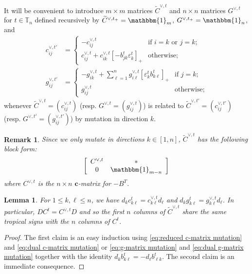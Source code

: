 \documentclass{amsart}
\newtheorem{lemma}[theorem]{Lemma}
\newtheorem{remark}[theorem]{Remark}
\numberwithin{theorem}{section}
\newcommand{\bfc}{\boldsymbol{c}}
\newcommand{\TT}{\mathbb{T}}
\newcommand{\bOne}{\mathbbm{1}}
\begin{document}
  It will be convenient to introduce $m\times m$ matrices $\widetilde C^{\vee,t}$ and $n\times n$ matrices $G^{\vee,t}$ for $t\in\TT_n$ defined recursively by $\widetilde C^{\vee,t_+}=\bOne_m$, $G^{\vee,t_+}=\bOne_n$, and 
  \begin{align}
    \label{eq:dual c-matrix mutation}
    c^{\vee,t'}_{ij} &= \begin{cases} -c^{\vee,t}_{ij} & \text{if $i=k$ or $j=k$;}\\ c^{\vee,t}_{ij} + c^{\vee,t}_{ik} [-b^t_{jk} \varepsilon^t_k]_+ & \text{otherwise;} \end{cases}\\
    \label{eq:dual g-matrix mutation}
    g^{\vee,t'}_{ij} &= \begin{cases} -g^{\vee,t}_{ik} + \sum\limits_{\ell=1}^n g^{\vee,t}_{i \ell} [\varepsilon^t_k b^t_{k \ell}]_+ & \text{if $j=k$;}\\ g^{\vee,t}_{ij} & \text{otherwise;} \end{cases}
  \end{align}
  whenever $\widetilde C^{\vee,t}=(c^{\vee,t}_{ij})$ (resp. $G^{\vee,t}=(g^{\vee,t}_{ij})$) is related to $\widetilde C^{\vee,t'}=(c^{\vee,t'}_{ij})$ (resp. $G^{\vee,t'}=(g^{\vee,t'}_{ij})$) by mutation in direction $k$.
  \begin{remark}
    \label{rem:dual c-matrix structure}
    Since we only mutate in directions $k\in[1,n]$, $\widetilde C^{\vee,t}$ has the following block form:
    \[\left[\begin{array}{cc} C^{\vee,t} & *\\ 0 & \bOne_{m-n}\end{array}\right]\]
    where $C^{\vee,t}$ is the $n\times n$ $\bfc$-matrix for $-B^T$.
  \end{remark}
  \begin{lemma}
    \label{le:tropical signs}
    For $1\le k,\ell\le n$, we have $d_k c^t_{k\ell} = c^{\vee,t}_{k\ell} d_\ell $ and $d_k g^t_{k\ell} = g^{\vee,t}_{k\ell} d_\ell$.
    In particular, $D C^t = C^{\vee,t} D$ and so the first $n$ columns of $\widetilde C^{\vee,t}$ share the same tropical signs with the $n$ columns of $C^t$.
  \end{lemma}
  \begin{proof}
    The first claim is an easy induction using \eqref{eq:reduced c-matrix mutation} and \eqref{eq:dual c-matrix mutation} or \eqref{eq:g-matrix mutation} and \eqref{eq:dual g-matrix mutation} together with the identity $d_k b^t_{k\ell} = - d_\ell b^t_{\ell k}$.
    The second claim is an immediate consequence.
  \end{proof}
\end{document}
